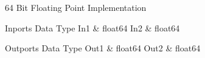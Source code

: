\ifdefined \AddTestReports
{}
\fi
{}
\nopagebreak[0]

64 Bit Floating Point Implementation

\begin{XtoCtabular}{Inports Data Type}
In1 & float64\tabularnewline
\hline
In2 & float64\tabularnewline
\hline
\end{XtoCtabular}

\begin{XtoCtabular}{Outports Data Type}
Out1 & float64\tabularnewline
\hline
Out2 & float64\tabularnewline
\hline
\end{XtoCtabular}

\ifdefined \AddTestReports
{}
\fi
